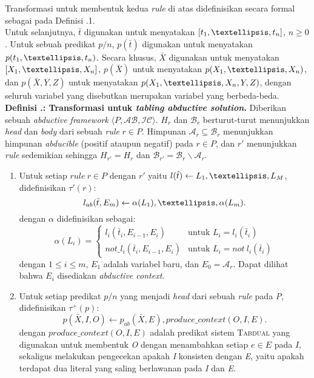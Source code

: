 Transformasi untuk membentuk kedua \textit{rule} di atas didefinisikan secara formal sebagai pada Definisi \thebabTigaNum.1.
\\

Untuk selanjutnya, $\bar{t}$ digunakan untuk menyatakan $[t_1, \textellipsis ,t_n]$, $n \geq 0$. Untuk sebuah predikat $p/n$, $p(\bar{t})$ digunakan untuk menyatakan $p(t_1, \textellipsis , t_n)$. Secara khusus, $\bar{X}$ digunakan untuk menyatakan $[X_1, \textellipsis , X_n]$, $p(\bar{X})$ untuk menyatakan $p(X_1, \textellipsis , X_n)$, dan $p(\bar{X},Y,Z)$ untuk menyatakan $p(X_1, \textellipsis , X_n,Y,Z)$, dengan seluruh variabel yang disebutkan merupakan variabel yang berbeda-beda.
\\

\noindent \textbf{Definisi \thebabTigaNum.\thedefBabTiga: Transformasi untuk \textit{tabling abductive solution}.} Diberikan sebuah \textit{abductive framework} $\langle  P,\mathcal{AB},\mathcal{IC} \rangle$. $H_r$ dan $\mathcal{B}_r$ berturut-turut menunjukkan \textit{head} dan \textit{body} dari sebuah \textit{rule} $r \in P$. Himpunan $\mathcal{A}_r \subseteq \mathcal{B}_r$ menunjukkan himpunan \textit{abducible} (positif ataupun negatif) pada $r \in P$, dan $r'$ menunjukkan \textit{rule} sedemikian sehingga $H_{r'} = H_r$ dan $\mathcal{B}_{r'} = \mathcal{B}_r \backslash \mathcal{A}_r$.

\begin{enumerate}
	\item Untuk setiap $rule \ r \in P$ dengan $r'$ yaitu $l(\hat{t}) \leftarrow L_1, \textellipsis , L_M$, didefinisikan $\tau'(r)$:
	\begin{displaymath}
		l_{ab}(\bar{t},E_m) \leftarrow \alpha(L_1), \textellipsis , \alpha(L_m).
	\end{displaymath}
	dengan $\alpha$ didefinisikan sebagai:
	\begin{displaymath}
	\alpha(L_i) = 
	\begin{cases}
	l_i(\bar{t}_i,E_{i-1},E_i) & \text{untuk $L_i = l_i(\bar{t}_i)$} \\
	not\_l_i(\bar{t}_i,E_{i-1},E_i) & \text{untuk $L_i = not \ l_i(\bar{t}_i)$}
	\end{cases}
	\end{displaymath}
	dengan $1 \leq i \leq m$, $E_1$ adalah variabel baru, dan $E_0 = \mathcal{A}_r$. Dapat dilihat bahwa $E_i$ disediakan \textit{abductive context}.
	
	\item Untuk setiap predikat $p/n$ yang menjadi \textit{head} dari sebuah \textit{rule} pada \textit{P}, didefinisikan $\tau^+(p)$:
	\begin{displaymath}
		p(\bar{X},I,O) \leftarrow p_{ab}(\bar{X},E), produce\_context(O,I,E).
	\end{displaymath}
	dengan $produce\_context(O,I,E)$ adalah predikat sistem \textsc{Tabdual} yang digunakan untuk membentuk \textit{O} dengan menambahkan setiap $e \in E$ pada $I$, sekaligus melakukan pengecekan apakah \textit{I} konsisten dengan \textit{E}, yaitu apakah terdapat dua literal yang saling berlawanan pada \textit{I} dan \textit{E}.
\end{enumerate}

